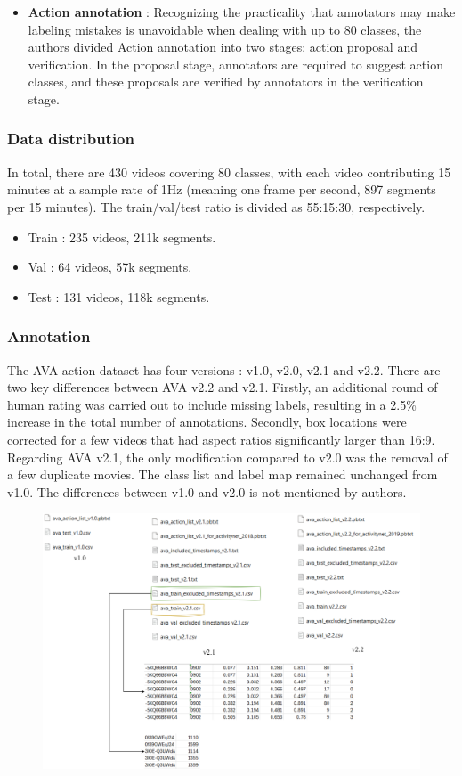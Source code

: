 \documentclass[10pt,onecolumn,letterpaper]{article}
\begin{document}
\begin{itemize}
	\item \textbf{Action annotation} : Recognizing the practicality that annotators may make labeling mistakes is unavoidable when dealing with up to 80 classes, the authors divided Action annotation into two stages: action proposal and verification. In the proposal stage, annotators are required to suggest action classes, and these proposals are verified by annotators in the verification stage.
	
\end{itemize}
	
\subsubsection{Data distribution}
	
	In total, there are 430 videos covering 80 classes, with each video contributing 15 minutes at a sample rate of 1Hz (meaning one frame per second, 897 segments per 15 minutes). The train/val/test ratio is divided as 55:15:30, respectively.
	\begin{itemize}
		\item Train : 235 videos, 211k segments.
		\item Val : 64 videos, 57k segments.
		\item Test : 131 videos, 118k segments.
	\end{itemize}
	
\subsubsection{Annotation}

The AVA action dataset has four versions : v1.0, v2.0, v2.1 and v2.2. There are two key differences between AVA v2.2 and v2.1. Firstly, an additional round of human rating was carried out to include missing labels, resulting in a 2.5\% increase in the total number of annotations. Secondly, box locations were corrected for a few videos that had aspect ratios significantly larger than 16:9. Regarding AVA v2.1, the only modification compared to v2.0 was the removal of a few duplicate movies. The class list and label map remained unchanged from v1.0. The differences between v1.0 and v2.0 is not mentioned by authors.

\begin{figure}[h]
	\centering
	\includegraphics[width=0.7\linewidth]{"fig_info/fig3/Untitled Diagram.drawio"}
	\caption{}
	\label{fig:untitled-diagram2}
\end{figure}
\end{document}
